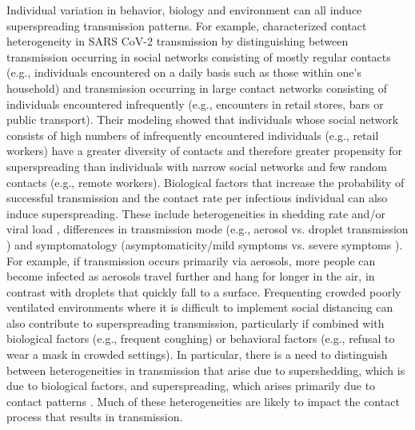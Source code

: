 \documentclass{imammb}
\numberwithin{equation}{section}
\begin{document}
Individual variation in behavior, biology and environment can all induce superspreading transmission patterns. For example, \citet{Sneppen2021-mr} characterized contact heterogeneity in SARS CoV-2 transmission by distinguishing between transmission occurring in social networks consisting of mostly regular contacts (e.g., individuals encountered on a daily basis such as those within one’s household) and transmission occurring in large contact networks consisting of individuals encountered infrequently (e.g., encounters in retail stores, bars or public transport). Their modeling showed that individuals whose social network consists of high numbers of infrequently encountered individuals (e.g., retail workers) have a greater diversity of contacts and therefore greater propensity for superspreading than individuals with narrow social networks and few random contacts (e.g., remote workers). Biological factors that increase the probability of successful transmission and the contact rate per infectious individual can also induce superspreading. These include heterogeneities in shedding rate and/or viral load \citep{Goyal2021-xr}, differences in transmission mode (e.g., aerosol vs. droplet transmission \citep{Chen2021-wo}) and symptomatology (asymptomaticity/mild symptoms vs. severe symptoms \citep{ Illingworth2021-rz}). For example, if transmission occurs primarily via aerosols, more people can become infected as aerosols travel further and hang for longer in the air, in contrast with droplets that quickly fall to a surface. Frequenting crowded poorly ventilated environments where it is difficult to implement social distancing can also contribute to superspreading transmission, particularly if combined with biological factors (e.g., frequent coughing) or behavioral factors (e.g., refusal to wear a mask in crowded settings). In particular, there is a need to distinguish between heterogeneities in transmission that arise due to supershedding, which is due to biological factors, and superspreading, which arises primarily due to contact patterns \citep{Rock2014-nc}. Much of these heterogeneities are likely to impact the contact process that results in transmission.

\end{document}
